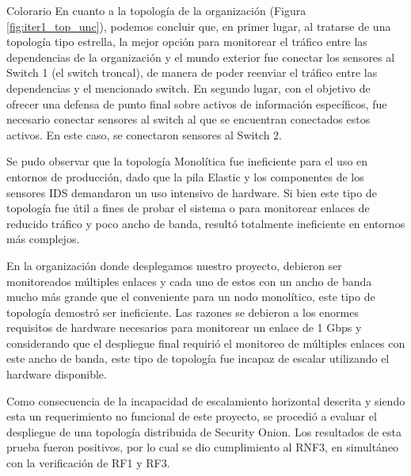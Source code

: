     
    \begin{section}{Colorario}
    En cuanto a la topología de la organización (Figura \ref{fig:iter1_top_unc}), podemos concluir que, en primer lugar, al tratarse de una topología tipo estrella, la mejor opción para monitorear el tráfico entre las dependencias de la organización y el mundo exterior fue conectar los sensores al Switch 1 (el switch troncal), de manera de poder reenviar el tráfico entre las dependencias y el mencionado switch. En segundo lugar, con el objetivo de ofrecer una defensa de punto final sobre activos de información específicos, fue necesario conectar sensores al switch al que se encuentran conectados estos activos. En este caso, se conectaron sensores al Switch 2. \par 
    Se pudo observar que la topología Monolítica fue ineficiente para el uso en entornos de producción, dado que la pila Elastic y los componentes de los sensores IDS demandaron un uso intensivo de hardware. Si bien este tipo de topología fue útil a fines de probar el sistema o para monitorear enlaces de reducido tráfico y poco ancho de banda, resultó totalmente ineficiente en entornos más complejos.\par
    En la organización donde desplegamos nuestro proyecto, debieron ser monitoreados múltiples enlaces y cada uno de estos con un ancho de banda mucho más grande que el conveniente para un nodo monolítico, este tipo de topología demostró ser ineficiente. Las razones se debieron a los enormes requisitos de hardware necesarios para monitorear un enlace de 1 Gbps y considerando que el despliegue final requirió el monitoreo de múltiples enlaces con este ancho de banda, este tipo de topología fue incapaz de escalar utilizando el hardware disponible.\par
    Como consecuencia de la incapacidad de escalamiento horizontal descrita y siendo esta un requerimiento no funcional de este proyecto, se procedió a evaluar el despliegue de una topología distribuida de Security Onion. Los resultados de esta prueba fueron positivos, por lo cual se dio cumplimiento al RNF3, en simultáneo con la verificación de RF1 y RF3.\par

    \end{section}